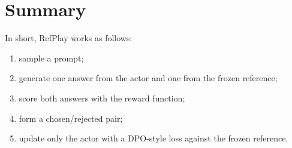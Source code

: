\documentclass[11pt]{article}
\begin{document}
\section{Summary}

In short, RefPlay works as follows:
\begin{enumerate}
  \item sample a prompt;
  \item generate one answer from the actor and one from the frozen reference;
  \item score both answers with the reward function;
  \item form a chosen/rejected pair;
  \item update only the actor with a DPO-style loss against the frozen reference.
\end{enumerate}
\end{document}
